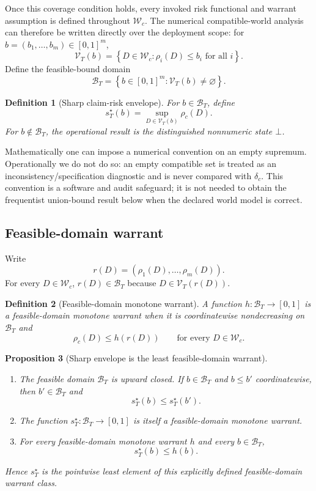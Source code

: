 \documentclass[10pt]{article}
\newtheorem{definition}{Definition}[section]
\newtheorem{proposition}[definition]{Proposition}
\newcommand{\Wc}{\mathcal W_c}
\newcommand{\Vk}{\mathcal V_T}
\newcommand{\BT}{\mathcal B_T}
\newcommand{\riskc}{\rho_c}
\begin{document}
Once this coverage condition holds, every invoked risk functional and warrant
assumption is defined throughout \(\Wc\).  The numerical compatible-world
analysis can therefore be written directly over the deployment scope:
for \(b=(b_1,\ldots,b_m)\in[0,1]^m\),
\[
\Vk(b)
=
\left\{
D\in\Wc:
\rho_i(D)\le b_i
\text{ for all }i
\right\}.
\]
Define the feasible-bound domain
\[
\boxed{
\BT
=
\left\{
b\in[0,1]^m:
\Vk(b)\neq\varnothing
\right\}.
}
\]

\begin{definition}[Sharp claim-risk envelope]
For \(b\in\BT\), define
\[
\boxed{
s_T^\star(b)
=
\sup_{D\in\Vk(b)}
\riskc(D).
}
\]
For \(b\notin\BT\), the operational result is the distinguished nonnumeric
state \(\bot\).
\end{definition}

Mathematically one can impose a numerical convention on an empty supremum.
Operationally we do not do so: an empty compatible set is treated as an
inconsistency/specification diagnostic and is never compared with
\(\delta_c\).  This convention is a software and audit safeguard; it is not
needed to obtain the frequentist union-bound result below when the declared
world model is correct.

\subsection{Feasible-domain warrant}

Write
\[
r(D)=(\rho_1(D),\ldots,\rho_m(D)).
\]
For every \(D\in\Wc\), \(r(D)\in\BT\) because
\(D\in\Vk(r(D))\).

\begin{definition}[Feasible-domain monotone warrant]
A function \(h:\BT\to[0,1]\) is a feasible-domain monotone warrant when it
is coordinatewise nondecreasing on \(\BT\) and
\[
\riskc(D)\le h(r(D))
\qquad
\text{for every }D\in\Wc.
\]
\end{definition}

\begin{proposition}[Sharp envelope is the least feasible-domain warrant]
\begin{enumerate}[label=(\roman*)]
\item The feasible domain \(\BT\) is upward closed.  If
\(b\in\BT\) and \(b\le b'\) coordinatewise, then
\(b'\in\BT\) and
\[
s_T^\star(b)\le s_T^\star(b').
\]
\item The function \(s_T^\star:\BT\to[0,1]\) is itself a
feasible-domain monotone warrant.
\item For every feasible-domain monotone warrant \(h\) and every
\(b\in\BT\),
\[
\boxed{
s_T^\star(b)\le h(b).
}
\]
\end{enumerate}
Hence \(s_T^\star\) is the pointwise least element of this explicitly
defined feasible-domain warrant class.
\end{proposition}
\end{document}
